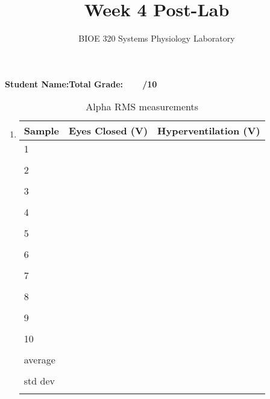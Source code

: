 \documentclass{article}
\title{Week 4 Post-Lab}
\author{BIOE 320 Systems Physiology Laboratory}
\date{}
\begin{document}
\maketitle
\large

\textbf{Student Name:}\hfill 	\textbf{Total Grade:\ \ \ \ /10}\vspace{0.5cm}

\begin{enumerate}
	\item
	\begin{table}[h]
	\centering
	\caption{Alpha RMS measurements}
	\begin{tabular}[h!]{p{}|p{}p{}}
	\toprule
	Sample & Eyes Closed (\textmu V) & Hyperventilation (\textmu V)\\
	\midrule
	1 & &\\ & &\\ \midrule
	2 & &\\ & &\\ \midrule
	3 & &\\ & &\\ \midrule
	4 & &\\ & &\\ \midrule
	5 & &\\ & &\\ \midrule
	6 & &\\ & &\\ \midrule
	7 & &\\ & &\\ \midrule
	8 & &\\ & &\\ \midrule
	9 & &\\ & &\\ \midrule
	10 & &\\ & &\\ \bottomrule
	average & &\\ & &\\ \midrule
	std dev & &\\ & &\\ \bottomrule
	\end{tabular}
	\end{table}
	\large
	

\end{enumerate}
\end{document}
